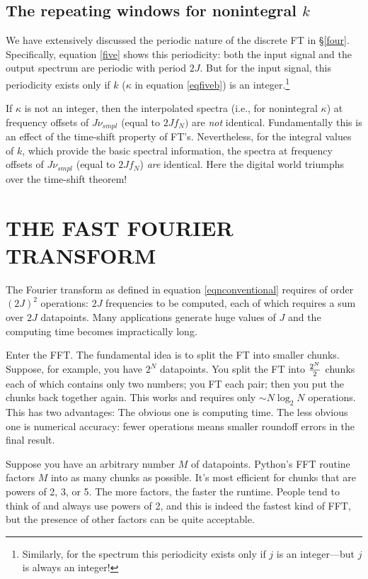 \documentclass[preprint]{aastex}
\begin{document}
\subsection{ The repeating windows for nonintegral $k$}
\label{sectionseven}

	We have extensively discussed the periodic nature of the
discrete FT in \S \ref{four}. Specifically, equation \ref{five} shows
this periodicity: both the input signal and the output spectrum are
periodic with period $2J$. But for the input signal, this periodicity
exists only if $k$ ($\kappa$ in equation \ref{eqfiveb}) is an
integer.\footnote{Similarly, for the spectrum this periodicity exists
only if $j$ is an integer---but $j$ is always an integer!}

	If $\kappa$ is not an integer, then the interpolated spectra
(i.e., for nonintegral $\kappa$) at frequency offsets of $J \nu_{smpl}$
(equal to $2J f_N)$ are {\it not} identical. Fundamentally this is an
effect of the time-shift property of FT's. Nevertheless, for the
integral values of $k$, which provide the basic spectral information,
the spectra at frequency offsets of $J \nu_{smpl}$ (equal to $2J f_N$)
{\it are} identical. Here the digital world triumphs over the time-shift
theorem!

\section{THE FAST FOURIER TRANSFORM}

	The Fourier transform as defined in equation
\ref{eqnconventional} requires of order $(2J)^2$ operations: $2J$
frequencies to be computed, each of which requires a sum over $2J$
datapoints. Many applications generate huge values of $J$ and the
computing time becomes impractically long.

	Enter the FFT. The fundamental idea is to split the FT into
smaller chunks. Suppose, for example, you have $2^N$ datapoints. You
split the FT into $2^N \over 2$ chunks each of which contains only two
numbers; you FT each pair; then you put the chunks back together again.
This works and requires only $\sim N \log_2 N$ operations. This has two
advantages:  The obvious one is computing time. The less obvious one is
numerical accuracy: fewer operations means smaller roundoff errors in
the final result.

 Suppose you have an arbitrary number $M$ of datapoints. Python's
FFT routine factors $M$ into as many chunks as possible. It's most
efficient for chunks that are powers of 2, 3, or 5. The more factors,
the faster the runtime. People tend to think of and always use powers of
2, and this is indeed the fastest kind of FFT, but the presence of other
factors can be quite acceptable.
\end{document}
